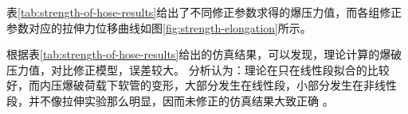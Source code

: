 表\ref{tab:strength-of-hose-results}给出了不同修正参数求得的爆压力值，而各组修正参数对应的拉伸力位移曲线如图\ref{fig:strength-elongation}所示。


\begin{figure}[!htp]
	\centering
	\hspace{0.5cm}
	\label{fig:stress}
\end{figure}


根据表\ref{tab:strength-of-hose-results}给出的仿真结果，可以发现，\ha 理论计算的爆破压力值，对比修正模型，误差较大。
分析认为：\ha 理论在只在线性段拟合的比较好，而内压爆破荷载下软管的变形，大部分发生在线性段，小部分发生在非线性段，并不像拉伸实验那么明显，因而\ha 未修正的仿真结果大致正确 。








